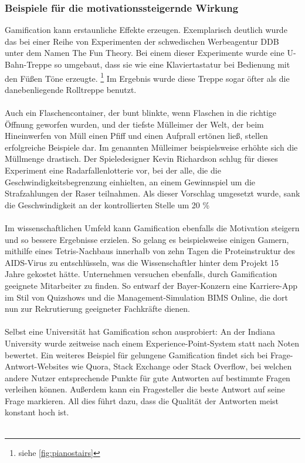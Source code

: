 \subsubsection{Beispiele für die motivationssteigernde Wirkung}
Gamification kann erstaunliche Effekte erzeugen. Exemplarisch deutlich wurde das bei einer Reihe von Experimenten der schwedischen Werbeagentur DDB unter dem Namen \glqq The Fun Theory\grqq . Bei einem dieser Experimente wurde eine U-Bahn-Treppe so umgebaut, dass sie wie eine Klaviertastatur bei Bedienung mit den Füßen Töne erzeugte. \footnote[4]{siehe \autoref{fig:pianostairs}} Im Ergebnis wurde diese Treppe sogar öfter als die danebenliegende Rolltreppe benutzt. \cite{Src:PlanetWissen} \\ \\
Auch ein Flaschencontainer, der bunt blinkte, wenn Flaschen in die richtige Öffnung geworfen wurden, und der \glqq tiefste Mülleimer der Welt\grqq , der beim Hineinwerfen von Müll einen Pfiff und einen Aufprall ertönen ließ, stellen erfolgreiche Beispiele dar. Im genannten Mülleimer beispielsweise erhöhte sich die Müllmenge drastisch. \cite{Src:PlanetWissen} Der Spieledesigner Kevin Richardson schlug für dieses Experiment eine Radarfallenlotterie vor, bei der alle, die die Geschwindigkeitsbegrenzung einhielten, an einem Gewinnspiel um die Strafzahlungen der Raser teilnahmen. Als dieser Vorschlag umgesetzt wurde, sank die Geschwindigkeit an der kontrollierten Stelle um 20 \% \cite{Src:GamifDesign} \\ \\
Im wissenschaftlichen Umfeld kann Gamification ebenfalls die Motivation steigern und so bessere Ergebnisse erzielen. So gelang es beispielsweise einigen Gamern, mithilfe eines Tetris-Nachbaus innerhalb von zehn Tagen die Proteinstruktur des AIDS-Virus zu entschlüsseln, was die Wissenschaftler hinter dem Projekt 15 Jahre gekostet hätte. \cite{Src:DLFMotiv} Unternehmen versuchen ebenfalls, durch Gamification geeignete Mitarbeiter zu finden. So entwarf der Bayer-Konzern eine Karriere-App im Stil von Quizshows und die Management-Simulation \glqq BIMS Online\grqq , die dort nun zur Rekrutierung geeigneter Fachkräfte dienen. \\ \\
Selbst eine Universität hat Gamification schon ausprobiert: An der Indiana University wurde zeitweise nach einem Experience-Point-System statt nach Noten bewertet. \cite{Src:XPNoten} Ein weiteres Beispiel für gelungene Gamification findet sich bei Frage-Antwort-Websites wie Quora, Stack Exchange oder Stack Overflow, bei welchen andere Nutzer entsprechende Punkte für gute Antworten auf bestimmte Fragen verleihen können. Außerdem kann ein Fragesteller die beste Antwort auf seine Frage markieren. All dies führt dazu, dass die Qualität der Antworten meist konstant hoch ist. \cite{Src:GamifDesign} \\ \\
